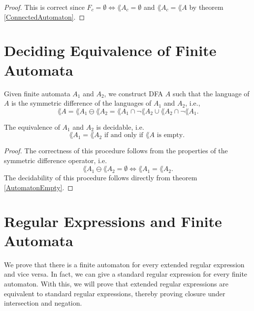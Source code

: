 \documentclass[11pt,a4paper,oneside]{book}
\begin{document}
            \begin{proof}
                This is correct since $F_c = \emptyset \Leftrightarrow \lang{A_c} = \emptyset$ and $\lang{A_c} = \lang{A}$ by theorem \ref{ConnectedAutomaton}.
            \end{proof}


        \section{Deciding Equivalence of Finite Automata}
            Given finite automata $A_1$ and $A_2$, we construct DFA $A$ such that the language of $A$ is the symmetric difference of the languages of $A_1$ and $A_2$, i.e.,
            \[ 
                \lang{A} = \lang{A_1} \ominus \lang{A_2} = \lang{A_1} \cap \neg \lang{A_2} \cup \lang{A_2} \cap \neg \lang{A_1}.
            \]
            \begin{theorem} The equivalence of $A_1$ and $A_2$ is decidable, i.e.
                \[
                    \lang{A_1} = \lang{A_2} \mbox{ if and only if } \lang{A} \mbox{ is empty. }
                \]
            \end{theorem}
            \begin{proof}
                The correctness of this procedure follows from the properties of the symmetric difference operator, i.e.
                \[ 
                    \lang{A_1} \ominus \lang{A_2} = \emptyset \Leftrightarrow \lang{A_1} = \lang{A_2}.
                \]
                The decidability of this procedure follows directly from theorem \ref{AutomatonEmpty}.
            \end{proof}

            
        \section{Regular Expressions and Finite Automata}

            \paragraph{} 
                We prove that there is a finite automaton for every extended regular expression and vice versa. 
                In fact, we can give a standard regular expression for every finite automaton.
                With this, we will prove that extended regular expressions are equivalent to standard regular expressions, 
                thereby proving closure under intersection and negation.
                
\end{document}
